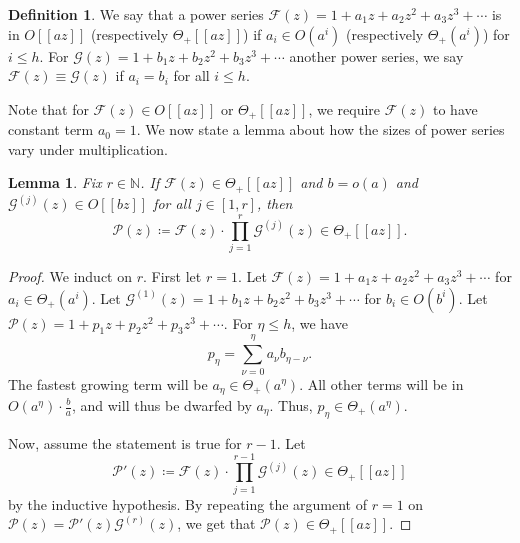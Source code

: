 \documentclass[10pt,a4paper]{article}
\newtheorem{lemma}[theorem]{Lemma}
\theoremstyle{definition}
\newtheorem{definition}[theorem]{Definition}
\theoremstyle{remark}
\numberwithin{equation}{section}
\numberwithin{theorem}{section}
\newcommand{\N}{\mathbb{N}}
\newcommand{\calf}{\mathcal{F}}
\newcommand{\calg}{\mathcal{G}}
\newcommand{\calp}{\mathcal{P}}
\begin{document}
\begin{definition}
    We say that a power series $\calf(z) = 1 + a_1z+a_2z^{2} + a_3z^3 + \cdots$ is in $O[[az]]$ (respectively $\Theta_+[[az]]$) if $a_i \in O(a^i)$ (respectively $\Theta_+(a^i)$) for $i \leq h$. For $\calg(z)= 1 + b_1z+b_2z^{2} + b_3z^3 + \cdots$ another power series, we say $\calf(z) \equiv \calg(z)$ if $a_i = b_i$ for all $i \leq h$.
\end{definition}

Note that for $\calf(z) \in O[[az]]$ or $\Theta_+[[az]]$, we require $\calf(z)$ to have constant term $a_0 = 1$. We now state a lemma about how the sizes of power series vary under multiplication.

\begin{lemma}\label{lemmaProductsofGenFuncs}
    Fix $r \in \N$. If $\calf(z) \in \Theta_+[[az]]$ and $b = o(a)$ and $\calg^{(j)}(z) \in O[[bz]]$ for all $j \in [1,r]$, then \[\calp(z) \coloneq \calf(z)\cdot \prod_{j=1}^r\calg^{(j)}(z) \in \Theta_+[[az]].\]
\end{lemma}
\begin{proof}
    We induct on $r$. First let $r = 1$. Let $\calf(z) = 1 +a_1z+a_2z^{2} + a_3z^3 + \cdots$ for $a_i \in \Theta_+(a^i)$. Let $\calg^{(1)}(z) = 1 +b_1z+b_2z^{2} + b_3z^3 + \cdots$ for $b_i \in O(b^i)$. Let $\calp(z) = 1+p_1z+p_2z^2+p_3z^3 + \cdots $. For $\eta \leq h$, we have \[p_\eta = \sum_{\nu=0}^\eta a_\nu b_{\eta-\nu}.\] The fastest growing term will be $a_\eta \in \Theta_+(a^\eta)$. All other terms will be in $O(a^\eta) \cdot \frac{b}{a}$, and will thus be dwarfed by $a_\eta$. Thus, $p_{\eta} \in \Theta_+(a^\eta)$. 

    Now, assume the statement is true for $r -1$. Let \[\calp'(z) \coloneq \calf(z)\cdot \prod_{j=1}^{r-1}\calg^{(j)}(z) \in \Theta_+[[az]]\] by the inductive hypothesis. By repeating the argument of $r = 1$ on $\calp(z) = \calp'(z)\calg^{(r)}(z)$, we get that $\calp(z) \in \Theta_+[[az]]$.
\end{proof}
\end{document}
